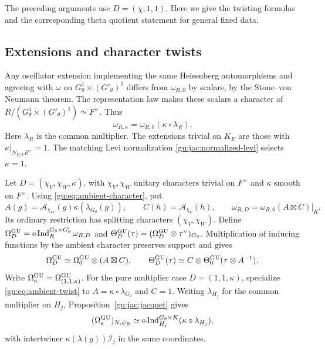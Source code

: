 \label{gu:app:splitting}
The preceding arguments use $D=(\chi,1,1)$. Here we give the twisting
formulas and the corresponding theta quotient statement for general
fixed data.

\subsection{Extensions and character twists}
Any oscillator extension implementing the same Heisenberg
automorphisms and agreeing with $\omega$ on $G_\theta^1\times (G'_\theta)^1$ differs
from $\omega_{R,0}$ by scalars, by the Stone--von Neumann theorem.
The representation law makes these scalars a character of
$R/(G_\theta^1\times (G'_\theta)^1)\simeq F^\times$. Thus
\begin{equation}\label{gu:jac:extension-twist}
 \omega_{R,\kappa}=\omega_{R,0}(\kappa\circ\lambda_R).
\end{equation}
Here $\lambda_R$ is the common multiplier. The extensions trivial
on $K_E$ are those with $\kappa|_{N_{E/F}E^\times}=1$. The matching Levi
normalization \eqref{gu:jac:normalized-levi} selects $\kappa=1$.

Let $D=(\chi_V,\chi_W,\kappa)$, with $\chi_V,\chi_W$ unitary
characters trivial on $F^\times$ and $\kappa$ smooth on $F^\times$.
Using \eqref{gu:eq:ambient-character}, put
\begin{equation}\label{gu:eq:A-C}
 A(g)=\mathcal A_{\chi_W}(g)\kappa(\lambda_{G_\theta}(g)),\qquad
 C(h)=\mathcal A_{\chi_V}(h),\qquad
 \omega_{R,D}=\omega_{R,0}(A\boxtimes C)|_R.
\end{equation}
Its ordinary restriction has splitting characters $(\chi_V,\chi_W)$.
Define $\Omega_D^{\operatorname{GU}}=\operatorname{c\!-Ind}_R^{G_\theta\times G'_\theta}\omega_{R,D}$ and
$\Theta_D^{\operatorname{GU}}(\tau)=(\Omega_D^{\operatorname{GU}}\otimes\tau^\vee)_{G_\theta}$.
Multiplication of inducing functions by the ambient character preserves
support and gives
\begin{equation}\label{gu:eq:ambient-twist}
 \Omega_D^{\operatorname{GU}}\simeq\Omega_0^{\operatorname{GU}}\otimes(A\boxtimes C),\qquad
 \Theta_D^{\operatorname{GU}}(\tau)
 \simeq C\otimes\Theta_0^{\operatorname{GU}}(\tau\otimes A^{-1}).
\end{equation}
Write $\Omega_\kappa^{\operatorname{GU}}=\Omega_{(1,1,\kappa)}^{\operatorname{GU}}$.
For the pure multiplier case $D=(1,1,\kappa)$, specialize
\eqref{gu:eq:ambient-twist} to $A=\kappa\circ\lambda_{G_\theta}$ and $C=1$.
Writing $\lambda_{H_j}$ for the common multiplier on $H_j$,
Proposition~\ref{gu:jac:jacquet} gives
\[
 (\Omega_\kappa^{\operatorname{GU}})_{N,\psi_B}
 \simeq\operatorname{c\!-Ind}_{H_j}^{G_\theta\times K}(\kappa\circ\lambda_{H_j}),
\]
with intertwiner $\kappa(\lambda(g))\mathcal I_j$ in the same coordinates.

